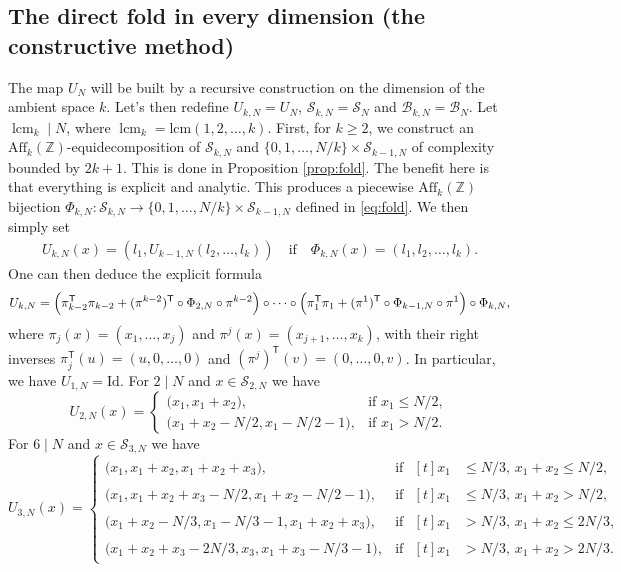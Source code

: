 \documentclass[a4paper,reqno,12pt]{amsart}
\theoremstyle{plain}
\theoremstyle{plain}
\theoremstyle{remark}
\theoremstyle{plain}
\newcommand{\B}{\mathscr{B}}
\newcommand{\cS}{\mathscr{S}}
\newcommand{\aff}{\text{Aff}}
\newcommand{\Z}{\mathbb{Z}}
\newcommand{\lcmk}{\operatorname{lcm}_k}
\theoremstyle{plain}
\theoremstyle{plain}
\begin{document}
{\subsection{The direct fold in every dimension (the constructive method)}
The map $U_N$ will be built by a recursive construction on the dimension of the ambient space $k$.
{Let's} then {redefine} $U_{k,N}=U_N$, $\cS_{k,N}=\cS_N$ and $\B_{k,N}=\B_N$. Let $\lcmk \mid N$, where $\lcmk = \text{lcm}(1,2,\ldots,k)$. First{, for $k\geq2$,} we construct an $\aff_k(\Z)$-equidecomposition of $\cS_{k,N}$ and $\{0,1,\ldots,N/k\} \times \cS_{k-1,N}$ of complexity bounded by ${2k+1}$. This is done in Proposition \ref{prop:fold}. The benefit here is that everything is explicit and analytic. This produces a piecewise $\aff_k(\Z)$ bijection $\Phi_{k,N}: \cS_{k,N}\to \{0,1,\ldots,N/k\} \times \cS_{k-1,N}$ defined in \eqref{eq:fold}. We then simply set
\begin{align}\label{def:UN}
U_{k,N}(x) = (l_1,  U_{k-1,N}(l_2,\ldots,l_k) ) \quad \text{if} \quad \Phi_{k,N}(x) = (l_1,l_2,\ldots,l_k).
\end{align}
One can then  deduce the explicit formula
\begin{align*}
U_{k,N}
=
\Bigl(
\pi_{k-2}^{\mathsf T}\pi_{k-2}
+(\pi^{k-2})^{\mathsf T}\circ\Phi_{2,N}\circ\pi^{k-2}
\Bigr)\circ\cdots\circ
\Bigl(
\pi_1^{\mathsf T}\pi_1
+(\pi^1)^{\mathsf T}\circ\Phi_{k-1,N}\circ\pi^1
\Bigr)
\circ\Phi_{k,N},
\end{align*}
where $\pi_j(x)=(x_1,\ldots,x_j)$ and $\pi^j(x)=(x_{j+1},\ldots,x_k)$,  with their right inverses $\pi_j^{\mathsf T}(u)=(u,0,\ldots,0)$
and $(\pi^j)^{\mathsf T}(v)=(0,\ldots,0,v)$. In particular, we have $U_{1,N}=\mathrm{Id}$. For
$2\mid N$ and $x\in\cS_{2,N}$ we have
\[
U_{2,N}(x)=
\begin{cases}
\bigl(x_1,x_1+x_2\bigr),
& \text{if }x_1\leq N/2,\\
\bigl(x_1+x_2-N/2,x_1-N/2-1\bigr),
& \text{if }x_1>N/2.
\end{cases}
\]
For $6\mid N$ and $x\in\cS_{3,N}$ we have
\[
U_{3,N}(x)=
\begin{cases}
\bigl(x_1,x_1+x_2,x_1+x_2+x_3\bigr),
& \text{if }
  \begin{aligned}[t]
  x_1&\leq N/3,\, x_1+x_2\leq N/2,
  \end{aligned}\\[0mm]
\bigl(x_1,x_1+x_2+x_3-N/2,x_1+x_2-N/2-1\bigr),
& \text{if }
  \begin{aligned}[t]
  x_1&\leq N/3,\, x_1+x_2>N/2,
  \end{aligned}\\[0mm]
\bigl(x_1+x_2-N/3,x_1-N/3-1,x_1+x_2+x_3\bigr),
& \text{if }
  \begin{aligned}[t]
  x_1&>N/3,\, x_1+x_2\leq 2N/3,
  \end{aligned}\\[0mm]
\bigl(x_1+x_2+x_3-2N/3,x_3,x_1+x_3-N/3-1\bigr),
& \text{if }
  \begin{aligned}[t]
  x_1&>N/3,\, x_1+x_2>2N/3.
  \end{aligned}
\end{cases}
\]




}
\end{document}

